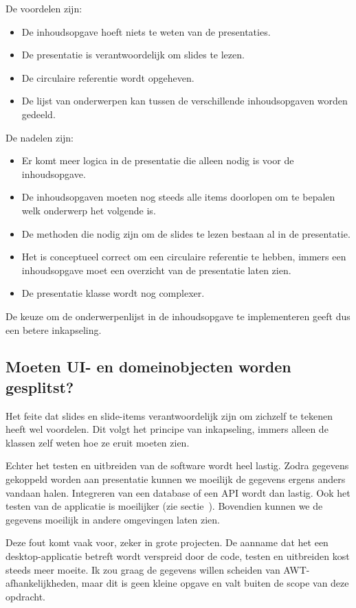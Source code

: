 \documentclass[a4paper]{article}
\newcommand{\question}[1]{
  \subsection{#1}
}
\begin{document}
    De voordelen zijn:
    \begin{itemize}
        \item De inhoudsopgave hoeft niets te weten van de presentaties.
        \item De presentatie is verantwoordelijk om slides te lezen.
        \item De circulaire referentie wordt opgeheven.
        \item De lijst van onderwerpen kan tussen de verschillende inhoudsopgaven worden gedeeld.
    \end{itemize}

    De nadelen zijn:
    \begin{itemize}
        \item Er komt meer logica in de presentatie die alleen nodig is voor de in\-houds\-op\-gave.
        \item De inhoudsopgaven moeten nog steeds alle items doorlopen om te bepalen welk onderwerp het volgende is.
        \item De methoden die nodig zijn om de slides te lezen bestaan al in de presentatie.
        \item Het is conceptueel correct om een circulaire referentie te hebben, immers een inhoudsopgave moet een overzicht van de presentatie laten zien.
        \item De presentatie klasse wordt nog complexer.
    \end{itemize}
    
    De keuze om de onderwerpenlijst in de inhoudsopgave te implementeren geeft dus een betere inkapseling.

    \question{Moeten UI- en domeinobjecten worden gesplitst?}
    \label{q:ui-domein-vermenging}
    Het feite dat slides en slide-items verantwoordelijk zijn om zichzelf te tekenen heeft wel voordelen.
    Dit volgt het principe van inkapseling, immers alleen de klassen zelf weten hoe ze eruit moeten zien.

    Echter het testen en uitbreiden van de software wordt heel lastig.
    Zodra gegevens gekoppeld worden aan presentatie kunnen we moeilijk de gegevens ergens anders vandaan halen.
    Integreren van een database of een API wordt dan lastig.
    Ook het testen van de applicatie is moeilijker (zie sectie~).
    Bovendien kunnen we de gegevens moeilijk in andere omgevingen laten zien.
    
    Deze fout komt vaak voor, zeker in grote projecten.
    De aanname dat het een desktop-applicatie betreft wordt verspreid door de code, testen en uitbreiden kost steeds meer moeite.
    Ik zou graag de gegevens willen scheiden van AWT-afhankelijkheden, maar dit is geen kleine opgave en valt buiten de scope van deze opdracht.
\end{document}
